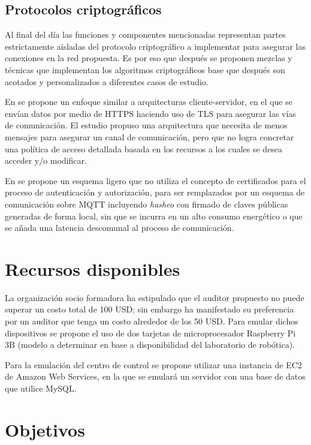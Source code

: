 \documentclass{article}
\begin{document}
        \subsection{Protocolos criptográficos}

            Al final del día las funciones y componentes mencionadas representan partes estrictamente aisladas del protocolo criptográfico a implementar para asegurar las conexiones en la red propuesta. Es por eso que después se proponen mezclas y técnicas que implementan los algoritmos criptográficos base que después son acotados y personalizados a diferentes casos de estudio.

            En \cite{abreu2020identity} se propone un enfoque similar a arquitecturas cliente-servidor, en el que se envían datos por medio de HTTPS haciendo uso de TLS para asegurar las vías de comunicación. El estudio propuso una arquitectura que necesita de menos mensajes para asegurar un canal de comunicación, pero que no logra concretar una política de acceso detallada basada en los recursos a los cuales se desea acceder y/o modificar.

            En \cite{lohachab2019ecc} se propone un esquema ligero que no utiliza el concepto de certificados para el proceso de autenticación y autorización, para ser remplazados por un esquema de comunicación sobre MQTT incluyendo \textit{hasheo} con firmado de claves públicas generadas de forma local, sin que se incurra en un alto consumo energético o que se añada una latencia descomunal al proceso de comunicación.

    \section{Recursos disponibles}

        La organización socio formadora ha estipulado que el auditor propuesto no puede superar un costo total de 100 USD; sin embargo ha manifestado su preferencia por un auditor que tenga un costo alrededor de los 50 USD. Para emular dichos dispositivos se propone el uso de dos tarjetas de microprocesador Raspberry Pi 3B
        (modelo a determinar en base a disponibilidad del laboratorio de robótica).

        Para la emulación del centro de control se propone utilizar una instancia de EC2 de Amazon Web Services, en la que se emulará un servidor con una base de datos que utilice MySQL.

    \section{Objetivos}
\end{document}
